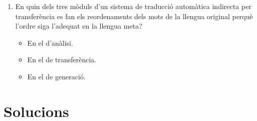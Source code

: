 \begin{enumerate}
\item En quin dels tres mòduls d'un sistema de traducció automàtica
  indirecta per transferència es fan els reordenaments dels mots de la
  llengua original perquè l'ordre siga l'adequat en la llengua meta?
  \begin{itemize}
  \item En el d'anàlisi.
  \item En el de transferència.
  \item En el de generació.
  \end{itemize}

\end{enumerate}

\section{Solucions}
